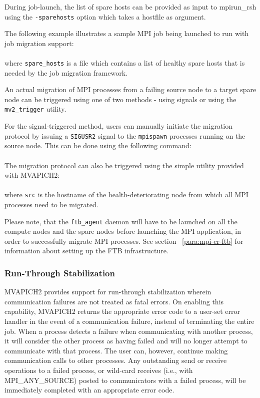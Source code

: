 During job-launch, the list of spare hosts can be provided as input to
mpirun\_rsh using the \verb|-sparehosts| option which takes a hostfile as
argument.

The following example illustrates a sample MPI job being launched
to run with job migration support:\\

\\

where \texttt{spare\_hosts} is a file which contains a list of healthy spare
hosts that is needed by the job migration framework.

An actual migration of MPI processes from a failing source node to a target
spare node can be triggered using one of two methods - using signals or using
the \texttt{mv2\_trigger} utility.

For the signal-triggered method, users can manually initiate the migration
protocol by issuing a \texttt{SIGUSR2} signal to the \texttt{mpispawn} processes
running on the source node.  This can be done using the following command:\\

\\


The migration protocol can also be triggered using the simple utility
provided with MVAPICH2:\\

\\

where \texttt{src} is the hostname of the  health-deteriorating node
from which all MPI processes need to be migrated.

Please note, that the \texttt{ftb\_agent} daemon will have to be launched on all
the compute nodes and the spare nodes before launching the MPI application, in
order to successfully migrate MPI processes. See section ~\ref{para:mpi-cr-ftb}
for information about setting up the FTB infrastructure.


\subsubsection{Run-Through Stabilization}

MVAPICH2 provides support for run-through stabilization wherein communication
failures are not treated as fatal errors.  On enabling this capability, MVAPICH2
returns the appropriate error code to a user-set error handler in the event of a
communication failure, instead of terminating the entire job.  When a process
detects a failure when communicating with another process, it will consider the
other process as having failed and will no longer attempt to communicate with
that process.  The user can, however, continue making communication calls to
other processes.  Any outstanding send or receive operations to a failed
process, or wild-card receives (i.e., with MPI\_ANY\_SOURCE) posted to
communicators with a failed process, will be immediately completed with an
appropriate error code.

